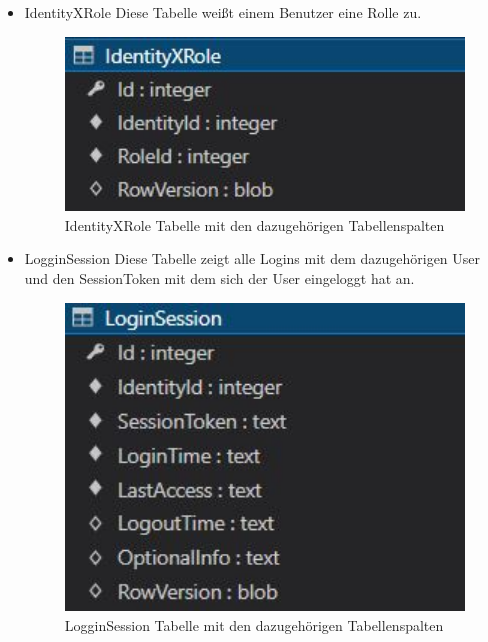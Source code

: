 \begin{itemize}
    \item IdentityXRole
    Diese Tabelle weißt einem Benutzer eine Rolle zu.
    \begin{figure}[H]
        \centering
        \includegraphics[width=1\textwidth]{pics/IdentityXRoleStructure.JPG}
        \caption{IdentityXRole Tabelle mit den dazugehörigen Tabellenspalten}
    \end{figure}
\end{itemize}


\begin{itemize}
    \item LogginSession
    Diese Tabelle zeigt alle Logins mit dem dazugehörigen User und den SessionToken mit dem sich der User eingeloggt hat an.
    \begin{figure}[H]
        \centering
        \includegraphics[width=1\textwidth]{pics/LoginSessionStructure.JPG}
        \caption{LogginSession Tabelle mit den dazugehörigen Tabellenspalten}
    \end{figure}
\end{itemize}

